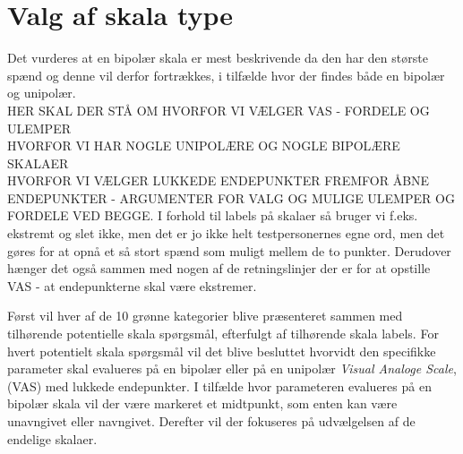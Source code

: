 \section{Valg af skala type}
\label{ParametreSkalaType}
%
Det vurderes at en bipolær skala er mest beskrivende da den har den største spænd og denne vil derfor fortrækkes, i tilfælde hvor der findes både en bipolær og unipolær.\\
%
%
HER SKAL DER STÅ OM HVORFOR VI VÆLGER VAS - FORDELE OG ULEMPER\\
HVORFOR VI HAR NOGLE UNIPOLÆRE OG NOGLE BIPOLÆRE SKALAER\\
HVORFOR VI VÆLGER LUKKEDE ENDEPUNKTER FREMFOR ÅBNE ENDEPUNKTER - ARGUMENTER FOR VALG OG MULIGE ULEMPER OG FORDELE VED BEGGE.\blankline
%
I forhold til labels på skalaer så bruger vi f.eks. ekstremt og slet ikke, men det er jo ikke helt testpersonernes egne ord, men det gøres for at opnå et så stort spænd som muligt mellem de to punkter. Derudover hænger det også sammen med nogen af de retningslinjer der er for at opstille VAS - at endepunkterne skal være ekstremer. 

Først vil hver af de 10 grønne kategorier blive præsenteret sammen med tilhørende potentielle skala spørgsmål, efterfulgt af tilhørende skala labels. For hvert potentielt skala spørgsmål vil det blive besluttet hvorvidt den specifikke parameter skal evalueres på en bipolær eller på en unipolær \textit{Visual Analoge Scale}, (VAS) med lukkede endepunkter. I tilfælde hvor parameteren evalueres på en bipolær skala vil der være markeret et midtpunkt, som enten kan være unavngivet eller navngivet. Derefter vil der fokuseres på udvælgelsen af de endelige skalaer.